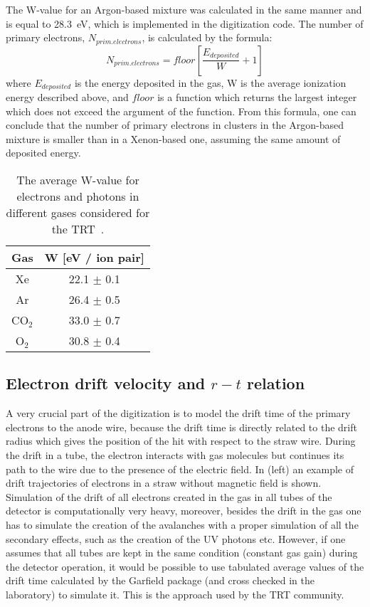 The W-value for an Argon-based mixture was calculated in the same manner and is equal to 28.3~eV, which is implemented in the digitization code.
The number of primary electrons, $N_{prim.electrons}$, is calculated by the formula:
\begin{equation}
 N_{prim.electrons} = floor \left[\dfrac{E_{deposited}}{W} + 1\right]
\end{equation}
where $E_{deposited}$ is the energy deposited in the gas, W is the average ionization energy described above, and $floor$ is a function which returns
the largest integer which does not exceed the argument of the function.
From this formula, one can conclude that the number of primary electrons in clusters in the Argon-based mixture is smaller than in a Xenon-based one, 
assuming the same amount of deposited energy.

\begin{table}[h]
  \begin{tabular}{c|c}
    Gas & W [eV / ion pair]\\
    \hline
    Xe & 22.1 $\pm$ 0.1 \\
    Ar & 26.4 $\pm$ 0.5 \\
    CO$_2$ & 33.0 $\pm$ 0.7 \\
    O$_2$ & 30.8 $\pm$ 0.4 \\
  \end{tabular}
  \caption{The average W-value for electrons and photons in different gases considered for the TRT~\cite{cwetanski_thesis}.}
  \label{tab:ionization_energy}
\end{table}

\subsection{Electron drift velocity and $r-t$ relation}
\label{subsec:el_drift_time}

A very crucial part of the digitization is to model the drift time of the primary electrons to the anode wire, because the drift time is directly related to the drift radius which gives the position of the hit with respect to the straw wire.
During the drift in a tube, the electron interacts with gas molecules but continues its path to the wire due to the presence of the electric field.
In  (left) an example of drift trajectories of electrons in a straw without magnetic field is shown.
Simulation of the drift of all electrons created in the gas in all tubes of the detector is computationally very heavy,
moreover, besides the drift in the gas one has to simulate the creation of the avalanches with a proper simulation of all the secondary effects,
such as the creation of the UV photons etc. However, if one assumes that all tubes are kept in the same condition (constant gas gain) during the detector operation, it would
be possible to use tabulated average values of the drift time calculated by the Garfield package (and cross checked in the laboratory) to simulate it.
This is the approach used by the TRT community. 

